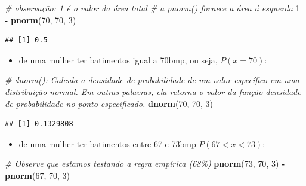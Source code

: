 \documentclass[
]{book}
\newenvironment{Shaded}{\begin{snugshade}}{\end{snugshade}}
\newcommand{\CommentTok}[1]{\textcolor[rgb]{0.56,0.35,0.01}{\textit{#1}}}
\newcommand{\DecValTok}[1]{\textcolor[rgb]{0.00,0.00,0.81}{#1}}
\newcommand{\FunctionTok}[1]{\textcolor[rgb]{0.13,0.29,0.53}{\textbf{#1}}}
\newcommand{\NormalTok}[1]{#1}
\newcommand{\SpecialCharTok}[1]{\textcolor[rgb]{0.81,0.36,0.00}{\textbf{#1}}}
\providecommand{\tightlist}{%
  \setlength{\itemsep}{0pt}\setlength{\parskip}{0pt}}
\begin{document}
\begin{Shaded}
\begin{Highlighting}[]
\CommentTok{\# observação: 1 é o valor da área total}
\CommentTok{\# a pnorm() fornece a área á esquerda}
\DecValTok{1} \SpecialCharTok{{-}} \FunctionTok{pnorm}\NormalTok{(}\DecValTok{70}\NormalTok{, }\DecValTok{70}\NormalTok{, }\DecValTok{3}\NormalTok{)}
\end{Highlighting}
\end{Shaded}

\begin{verbatim}
## [1] 0.5
\end{verbatim}

\begin{itemize}
\tightlist
\item
  de uma mulher ter batimentos igual a 70bmp, ou seja, \(P(x=70)\):
\end{itemize}

\begin{Shaded}
\begin{Highlighting}[]
\CommentTok{\# dnorm(): Calcula a densidade de probabilidade de um valor específico em uma distribuição normal. Em outras palavras, ela retorna o valor da função densidade de probabilidade no ponto especificado.}
\FunctionTok{dnorm}\NormalTok{(}\DecValTok{70}\NormalTok{, }\DecValTok{70}\NormalTok{, }\DecValTok{3}\NormalTok{)}
\end{Highlighting}
\end{Shaded}

\begin{verbatim}
## [1] 0.1329808
\end{verbatim}

\begin{itemize}
\tightlist
\item
  de uma mulher ter batimentos entre 67 e 73bmp \(P(67 < x < 73)\):
\end{itemize}

\begin{Shaded}
\begin{Highlighting}[]
\CommentTok{\# Observe que estamos testando a regra empírica (68\%)}
\FunctionTok{pnorm}\NormalTok{(}\DecValTok{73}\NormalTok{, }\DecValTok{70}\NormalTok{, }\DecValTok{3}\NormalTok{) }\SpecialCharTok{{-}} \FunctionTok{pnorm}\NormalTok{(}\DecValTok{67}\NormalTok{, }\DecValTok{70}\NormalTok{, }\DecValTok{3}\NormalTok{)}
\end{Highlighting}
\end{Shaded}
\end{document}
